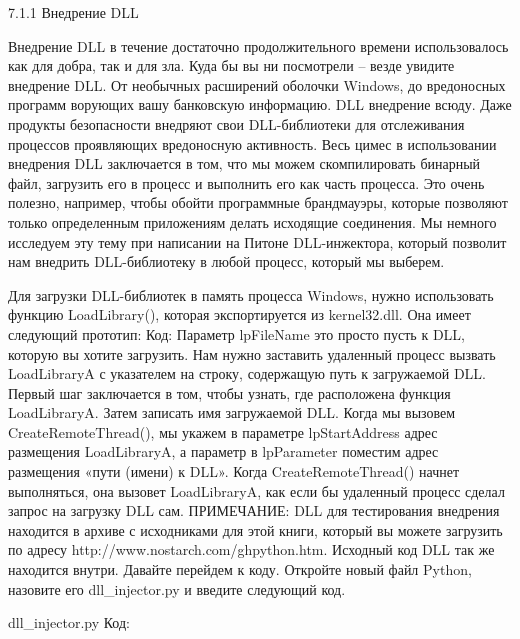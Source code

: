 \documentclass[12pt]{book}
\begin{document}
7.1.1 Внедрение DLL

Внедрение DLL в течение достаточно продолжительного времени использовалось как для добра, так и для зла. Куда бы вы ни посмотрели – везде увидите внедрение DLL. От необычных расширений оболочки Windows, до вредоносных программ ворующих вашу банковскую информацию. DLL внедрение всюду. Даже продукты безопасности внедряют свои DLL-библиотеки для отслеживания процессов проявляющих вредоносную активность. Весь цимес в использовании внедрения DLL заключается в том, что мы можем скомпилировать бинарный файл, загрузить его в процесс и выполнить его как часть процесса. Это очень полезно, например, чтобы обойти программные брандмауэры, которые позволяют только определенным приложениям делать исходящие соединения. Мы немного исследуем эту тему при написании на Питоне DLL-инжектора, который позволит нам внедрить DLL-библиотеку в любой процесс, который мы выберем.

Для загрузки DLL-библиотек в память процесса Windows, нужно использовать функцию LoadLibrary(), которая экспортируется из kernel32.dll. Она имеет следующий прототип:
Код:
Параметр lpFileName это просто пусть к DLL, которую вы хотите загрузить. Нам нужно заставить удаленный процесс вызвать LoadLibraryA с указателем на строку, содержащую путь к загружаемой DLL. Первый шаг заключается в том, чтобы узнать, где расположена функция LoadLibraryA. Затем записать имя загружаемой DLL. Когда мы вызовем CreateRemoteThread(), мы укажем в параметре lpStartAddress адрес размещения LoadLibraryA, а параметр в lpParameter поместим адрес размещения «пути (имени) к DLL». Когда CreateRemoteThread() начнет выполняться, она вызовет LoadLibraryA, как если бы удаленный процесс сделал запрос на загрузку DLL сам.
ПРИМЕЧАНИЕ: DLL для тестирования внедрения находится в архиве с исходниками для этой книги, который вы можете загрузить по адресу http://www.nostarch.com/ghpython.htm. Исходный код DLL так же находится внутри.
Давайте перейдем к коду. Откройте новый файл Python, назовите его dll\_injector.py и введите следующий код.

dll\_injector.py
Код:



\end{document}
